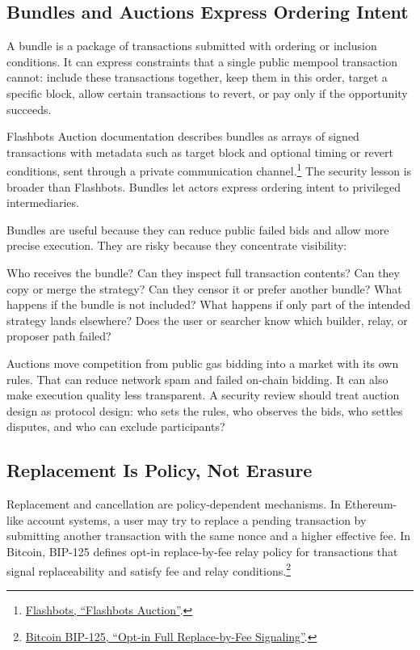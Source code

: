 \subsection{Bundles and Auctions Express Ordering Intent}

A bundle is a package of transactions submitted with ordering or inclusion conditions. It can express constraints that a single public mempool transaction cannot: include these transactions together, keep them in this order, target a specific block, allow certain transactions to revert, or pay only if the opportunity succeeds.

Flashbots Auction documentation describes bundles as arrays of signed transactions with metadata such as target block and optional timing or revert conditions, sent through a private communication channel.\footnote{\href{https://docs.flashbots.net/flashbots-auction/overview}{Flashbots, ``Flashbots Auction''}.} The security lesson is broader than Flashbots. Bundles let actors express ordering intent to privileged intermediaries.

Bundles are useful because they can reduce public failed bids and allow more precise execution. They are risky because they concentrate visibility:

\begin{codeblock}
Who receives the bundle?
Can they inspect full transaction contents?
Can they copy or merge the strategy?
Can they censor it or prefer another bundle?
What happens if the bundle is not included?
What happens if only part of the intended strategy lands elsewhere?
Does the user or searcher know which builder, relay, or proposer path failed?
\end{codeblock}

Auctions move competition from public gas bidding into a market with its own rules. That can reduce network spam and failed on-chain bidding. It can also make execution quality less transparent. A security review should treat auction design as protocol design: who sets the rules, who observes the bids, who settles disputes, and who can exclude participants?

\subsection{Replacement Is Policy, Not Erasure}

Replacement and cancellation are policy-dependent mechanisms. In Ethereum-like account systems, a user may try to replace a pending transaction by submitting another transaction with the same nonce and a higher effective fee. In Bitcoin, BIP-125 defines opt-in replace-by-fee relay policy for transactions that signal replaceability and satisfy fee and relay conditions.\footnote{\href{https://github.com/bitcoin/bips/blob/master/bip-0125.mediawiki}{Bitcoin BIP-125, ``Opt-in Full Replace-by-Fee Signaling''}.}

